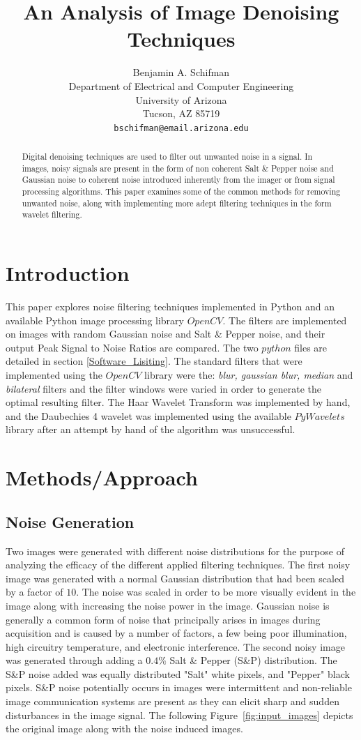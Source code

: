 \documentclass{article}\raggedbottom
\title{An Analysis of Image Denoising Techniques}
\author{
  Benjamin A. Schifman\\
  Department of Electrical and Computer Engineering\\
  University of Arizona\\
  Tucson, AZ 85719 \\
  \texttt{bschifman@email.arizona.edu} \\
}
\begin{document}
 

\maketitle

\begin{abstract}
  Digital denoising techniques are used to filter out unwanted noise in a signal. In images, noisy signals are present in the form of non coherent Salt \& Pepper noise and Gaussian noise to coherent noise introduced inherently from the imager or from signal processing algorithms. This paper examines some of the common methods for removing unwanted noise, along with implementing more adept filtering techniques in the form wavelet filtering. 
\end{abstract}

\section{Introduction}
 This paper explores noise filtering techniques implemented in Python and an available Python image processing library $OpenCV.$ The filters are implemented on images with random Gaussian noise and Salt \& Pepper noise, and their output Peak Signal to Noise Ratios are compared. The two $python$ files are detailed in section \ref{Software_Lisiting}. The standard filters that were implemented using the $OpenCV$ library were the: \textit{blur, gaussian blur, median} and \textit{bilateral} filters and the filter windows were varied in order to generate the optimal resulting filter. The Haar Wavelet Transform was implemented by hand, and the Daubechies 4 wavelet was implemented using the available $PyWavelets$ library after an attempt by hand of the algorithm was unsuccessful.

\section{Methods/Approach}
\subsection{Noise Generation}
Two images were generated with different noise distributions for the purpose of analyzing the efficacy of the different applied filtering techniques. The first noisy image was generated with a normal Gaussian distribution that had been scaled by a factor of $10$. The noise was scaled in order to be more visually evident in the image along with increasing the noise power in the image. Gaussian noise is generally a common form of noise that principally arises in images during acquisition and is caused by a number of factors, a few being poor illumination, high circuitry temperature, and electronic interference. The second noisy image was generated through adding a $0.4\%$ Salt \& Pepper (S\&P) distribution. The S\&P noise added was equally distributed "Salt" white pixels, and "Pepper" black pixels. S\&P noise potentially occurs in images were intermittent and non-reliable image communication systems are present as they can elicit sharp and sudden disturbances in the image signal. The following Figure~\ref{fig:input_images} depicts the original image along with the noise induced images.
\end{document}
